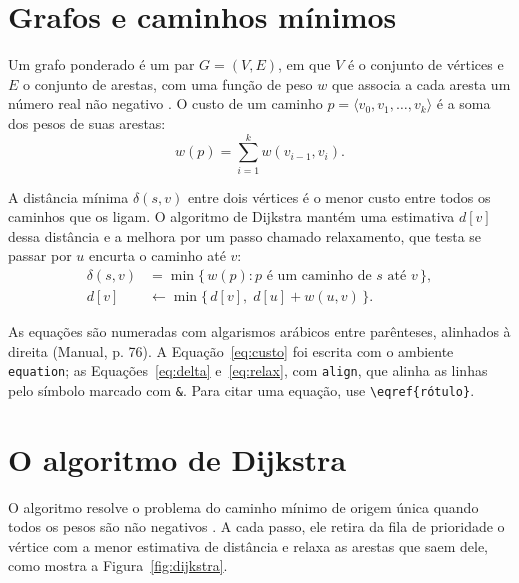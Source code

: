 \documentclass[diss,capa]{texufpel}
\begin{document}
\section{Grafos e caminhos mínimos}
\label{sec:grafos}

Um grafo ponderado é um par $G = (V, E)$, em que $V$ é o conjunto de vértices
e $E$ o conjunto de arestas, com uma função de peso $w$ que associa a cada
aresta um número real não negativo \citep{Cormen:2022:IA}. O custo de um
caminho $p = \langle v_0, v_1, \dots, v_k \rangle$ é a soma dos pesos de suas
arestas:
\begin{equation}
  w(p) = \sum_{i=1}^{k} w(v_{i-1}, v_i).
  \label{eq:custo}
\end{equation}

A distância mínima $\delta(s, v)$ entre dois vértices é o menor custo entre
todos os caminhos que os ligam. O algoritmo de Dijkstra mantém uma estimativa
$d[v]$ dessa distância e a melhora por um passo chamado relaxamento, que
testa se passar por $u$ encurta o caminho até $v$:
\begin{align}
  \delta(s, v) &= \min \{\, w(p) : p \text{ é um caminho de } s \text{ até } v \,\},
  \label{eq:delta}\\
  d[v] &\leftarrow \min \{\, d[v],\; d[u] + w(u, v) \,\}.
  \label{eq:relax}
\end{align}

As equações são numeradas com algarismos arábicos entre parênteses, alinhados
à direita (Manual, p. 76). A Equação~\eqref{eq:custo} foi escrita com o
ambiente \texttt{equation}; as Equações~\eqref{eq:delta} e~\eqref{eq:relax},
com \texttt{align}, que alinha as linhas pelo símbolo marcado com \verb|&|.
Para citar uma equação, use \verb|\eqref{rótulo}|.

\section{O algoritmo de Dijkstra}
\label{sec:dijkstra}

O algoritmo resolve o problema do caminho mínimo de origem única quando todos
os pesos são não negativos \citep{Dijkstra:1959:NTP}. A cada passo, ele retira
da fila de prioridade o vértice com a menor estimativa de distância e relaxa
as arestas que saem dele, como mostra a Figura~\ref{fig:dijkstra}.
\end{document}
